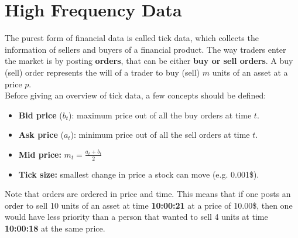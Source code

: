 \section{High Frequency Data}
\label{sec:highFrequencyData}
The purest form of financial data is called tick data, which collects the 
information of sellers and buyers of a financial product. The way traders 
enter the market is by posting \textbf{orders}, that can be either 
\textbf{buy or sell orders}. A buy (sell) order represents the will of a 
trader to buy (sell) $m$ units of an asset at a price $p$.\\

Before giving an overview of tick data, a few concepts should be defined:
\begin{itemize}
	\item \textbf{Bid price} ($b_t$): maximum price out of all the buy 
	orders at time $t$.
	
	\item \textbf{Ask price} ($a_t$): minimum price out of all the sell 
	orders at time $t$.
	
	\item \textbf{Mid price:} $m_t = \frac{a_t + b_t}{2}$
	
	
	
	\item \textbf{Tick size:} smallest change in price a stock can move 
	(e.g. 0.001\$).
\end{itemize}

Note that orders are ordered in price and time. This means that if one posts 
an order to sell 10 units of an asset at time \textbf{10:00:21} at a price 
of 10.00\$, then one would have less priority than a person that wanted to 
sell 4 units at time \textbf{10:00:18} at the same price.\\

